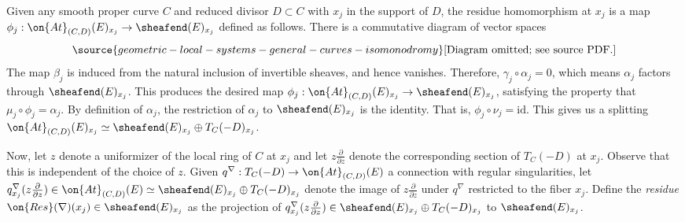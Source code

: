 Given any smooth proper curve $C$ and reduced divisor $D \subset C$ with $x_j$ in the support of $D$,
the residue homomorphism at $x_j$ is a map ${\phi}_j: \on{At}_{(C,D)}(E)_{x_j}
\to \sheafend(E)_{x_j}$ defined as follows.
There is a commutative diagram of vector spaces
\begin{equation}
	\label{equation:}
\source{geometric-local-systems-general-curves-isomonodromy}
	\text{[Diagram omitted; see source PDF.]}\end{equation}
The map $\beta_j$ is induced from the natural inclusion of invertible sheaves, and
hence vanishes.
Therefore, $\gamma_j \circ \alpha_j = 0$, which means $\alpha_j$ factors through
$\sheafend(E)_{x_j}$. This produces the desired map
${\phi}_j: \on{At}_{(C,D)}(E)_{x_j} \to \sheafend(E)_{x_j}$,
satisfying the property that $\mu_j\circ \phi_j  = \alpha_j$.
By definition of $\alpha_j$, the restriction of $\alpha_j$ to $\sheafend(E)_{x_j}$ is the identity.
That is, $\phi_j\circ \nu_j   = \mathrm{id}$.
This gives us a splitting
$\on{At}_{(C,D)}(E)_{x_j} \simeq  \sheafend(E)_{x_j} \oplus T_C(-D)_{x_j}$.

Now, let $z$ denote a uniformizer of the local ring of $C$
at $x_j$ and let $z \frac{\partial
}{\partial z}$ denote the corresponding section of $T_C(-D)$ at $x_j$.
Observe that this is independent of the choice of $z$.
Given $q^\nabla: T_C(-D) \to \on{At}_{(C,D)}(E)$ a connection with regular
singularities,
let $q^\nabla_{x_j}(z \frac{\partial }{\partial z}) \in \on{At}_{(C,D)}(E) \simeq  \sheafend(E)_{x_j} \oplus T_C(-D)_{x_j}$ denote the image of $z
\frac{\partial }{\partial z}$
under $q^\nabla$ restricted to the fiber $x_j$.
Define the {\em residue} $\on{Res}(\nabla)(x_j) \in \sheafend(E)_{x_j}$ as the
projection of
$q^\nabla_{x_j}(z \frac{\partial }{\partial z}) \in \sheafend(E)_{x_j} \oplus T_C(-D)_{x_j}$ to $\sheafend(E)_{x_j}$.

